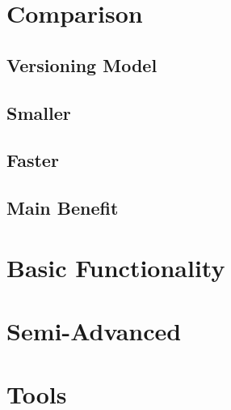 \begin{frame}
 \titlepage
\end{frame}

\section{Comparison}
	
	\subsection{Versioning Model}
	
	\subsection{Smaller}
	
	\subsection{Faster}
	
	\subsection{Main Benefit}
	
\section{Basic Functionality}

\section{Semi-Advanced}

\section{Tools}

